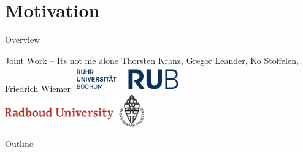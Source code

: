 \section{Motivation}
\begin{frame}{Overview}{}
    \begin{block}{Joint Work -- Its not me alone}
        \centering
        Thorsten Kranz, Gregor Leander, Ko Stoffelen, Friedrich Wiemer
        \includegraphics[width=0.35\textwidth]{data/logo_rub}
        \hspace{2em}
        \includegraphics[width=0.45\textwidth]{data/ru_en_branding}
    \end{block}
    \begin{block}{Outline}
        \vspace{0.5em}
        \tableofcontents
    \end{block}
\end{frame}

